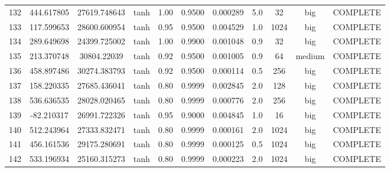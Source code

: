 \begin{longtable}{ccccccccccc}
                      132 &                 444.617805 &                       27619.748643 &            tanh &        1.00 & 0.9500 &       0.000289 &             5.0 &       32 &       big & COMPLETE \\
                      133 &                 117.599653 &                       28600.600954 &            tanh &        0.95 & 0.9500 &       0.004529 &             1.0 &     1024 &       big & COMPLETE \\
                      134 &                 289.649698 &                       24399.725002 &            tanh &        1.00 & 0.9900 &       0.001048 &             0.9 &       32 &       big & COMPLETE \\
                      135 &                 213.370748 &                        30804.22039 &            tanh &        0.92 & 0.9500 &       0.001005 &             0.9 &       64 &    medium & COMPLETE \\
                      136 &                 458.897486 &                       30274.383793 &            tanh &        0.92 & 0.9500 &       0.000114 &             0.5 &      256 &       big & COMPLETE \\
                      137 &                 158.220335 &                       27685.436041 &            tanh &        0.80 & 0.9999 &       0.002845 &             2.0 &      128 &       big & COMPLETE \\
                      138 &                 536.636535 &                       28028.020465 &            tanh &        0.80 & 0.9999 &       0.000776 &             2.0 &      256 &       big & COMPLETE \\
                      139 &                 -82.210317 &                       26991.722326 &            tanh &        0.95 & 0.9000 &       0.004845 &             1.0 &       16 &       big & COMPLETE \\
                      140 &                 512.243964 &                       27333.832471 &            tanh &        0.80 & 0.9999 &       0.000161 &             2.0 &     1024 &       big & COMPLETE \\
                      141 &                 456.161536 &                       29175.280691 &            tanh &        0.80 & 0.9999 &       0.000125 &             0.5 &     1024 &       big & COMPLETE \\
                      142 &                 533.196934 &                       25160.315273 &            tanh &        0.80 & 0.9999 &       0.000223 &             2.0 &     1024 &       big & COMPLETE \\
\end{longtable}
